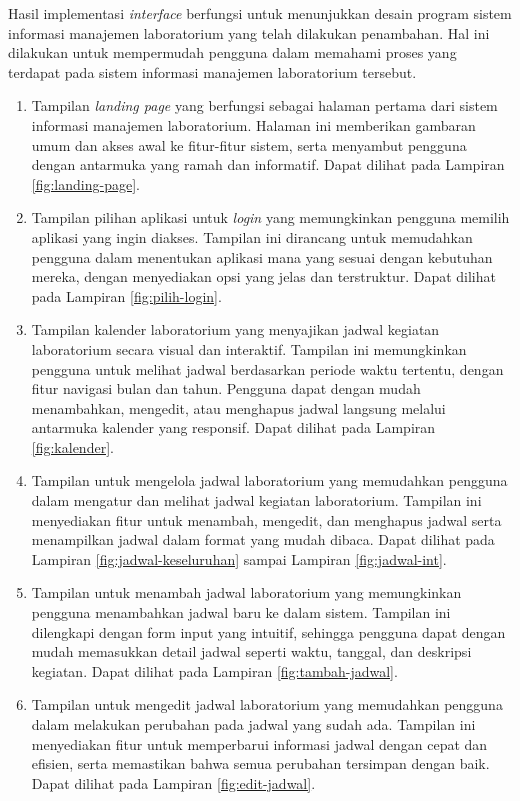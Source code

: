 Hasil implementasi \textit{interface} berfungsi untuk menunjukkan desain program sistem informasi manajemen laboratorium yang telah dilakukan penambahan. Hal ini dilakukan untuk mempermudah pengguna dalam memahami proses yang terdapat pada sistem informasi manajemen laboratorium tersebut.

\begin{enumerate}
	\item Tampilan \textit{landing page} yang berfungsi sebagai halaman pertama dari sistem informasi manajemen laboratorium. Halaman ini memberikan gambaran umum dan akses awal ke fitur-fitur sistem, serta menyambut pengguna dengan antarmuka yang ramah dan informatif. Dapat dilihat pada Lampiran \ref{fig:landing-page}.

	\item Tampilan pilihan aplikasi untuk \textit{login} yang memungkinkan pengguna memilih aplikasi yang ingin diakses. Tampilan ini dirancang untuk memudahkan pengguna dalam menentukan aplikasi mana yang sesuai dengan kebutuhan mereka, dengan menyediakan opsi yang jelas dan terstruktur. Dapat dilihat pada Lampiran \ref{fig:pilih-login}.

	\item Tampilan kalender laboratorium yang menyajikan jadwal kegiatan laboratorium secara visual dan interaktif. Tampilan ini memungkinkan pengguna untuk melihat jadwal berdasarkan periode waktu tertentu, dengan fitur navigasi bulan dan tahun. Pengguna dapat dengan mudah menambahkan, mengedit, atau menghapus jadwal langsung melalui antarmuka kalender yang responsif. Dapat dilihat pada Lampiran \ref{fig:kalender}.

	\item Tampilan untuk mengelola jadwal laboratorium yang memudahkan pengguna dalam mengatur dan melihat jadwal kegiatan laboratorium. Tampilan ini menyediakan fitur untuk menambah, mengedit, dan menghapus jadwal serta menampilkan jadwal dalam format yang mudah dibaca. Dapat dilihat pada Lampiran \ref{fig:jadwal-keseluruhan} sampai Lampiran \ref{fig:jadwal-int}.

	\item Tampilan untuk menambah jadwal laboratorium yang memungkinkan pengguna menambahkan jadwal baru ke dalam sistem. Tampilan ini dilengkapi dengan form input yang intuitif, sehingga pengguna dapat dengan mudah memasukkan detail jadwal seperti waktu, tanggal, dan deskripsi kegiatan. Dapat dilihat pada Lampiran \ref{fig:tambah-jadwal}.

	\item Tampilan untuk mengedit jadwal laboratorium yang memudahkan pengguna dalam melakukan perubahan pada jadwal yang sudah ada. Tampilan ini menyediakan fitur untuk memperbarui informasi jadwal dengan cepat dan efisien, serta memastikan bahwa semua perubahan tersimpan dengan baik. Dapat dilihat pada Lampiran \ref{fig:edit-jadwal}.


\end{enumerate}

